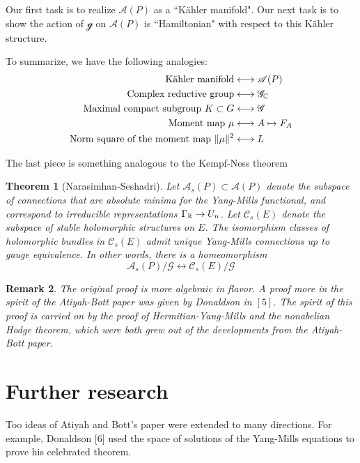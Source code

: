 \documentclass[11pt]{amsart}
\numberwithin{equation}{section}
\theoremstyle{plain}
\theoremstyle{plain}
\newtheorem{thmsub}{Theorem}[subsection]
\newtheorem{remksub}[thmsub]{Remark}
\numberwithin{equation}{section}
\begin{document}
Our first task is to realize $\mathscr{A}(P)$ as a “Kähler manifold". Our next task is to show the action of $\mathscr{g}$ on $\mathscr{A}(P)$ is “Hamiltonian" with respect to this Kähler structure.

To summarize, we have the following analogies:
$$
\begin{aligned}
\text{Kähler manifold}&\longleftrightarrow\mathscr{A}(P)\\
\text{Complex reductive group}&\longleftrightarrow\mathscr{G}_{\Bbb{C}}\\
\text{Maximal compact subgroup $K\subset G$}&\longleftrightarrow\mathscr{G}\\
\text{Moment map $\mu$}&\longleftrightarrow A\mapsto F_A\\
\text{Norm square of the moment map $\|\mu\|^2$}&\longleftrightarrow L
\end{aligned}
$$

The last piece is something analogous to the Kempf-Ness theorem
\begin{thmsub}[Narasimhan-Seshadri]
Let $\mathscr{A}_s(P)\subset\mathscr{A}(P)$ denote the subspace of connections that are absolute minima for the Yang-Mills functional, and correspond to irreducible representations $\Gamma_{\Bbb{R}}\to U_n$. Let $\mathscr{C}_s(E)$ denote the subspace of stable holomorphic structures on $E$. The isomorphism classes of holomorphic bundles in $\mathscr{C}_s(E)$ admit unique Yang-Mills connections up to gauge equivalence. In other words, there is a homeomorphism 
$$
\mathscr{A}_s(P)/\mathscr{G}\longleftrightarrow\mathscr{C}_s(E)/\mathscr{G}
$$
\end{thmsub}
\begin{remksub}\normalfont
The original proof is more algebraic in flavor. A proof more in the spirit of the Atiyah-Bott paper was given by Donaldson in $[5]$. The spirit of this proof is carried on by the proof of Hermitian-Yang-Mills and the nonabelian Hodge theorem, which were both grew out of the developments from the Atiyah-Bott paper.
\end{remksub}



\section{Further research}
Too ideas of Atiyah and Bott's paper were extended to many directions. For example, Donaldson [6] used the space of solutions of the Yang-Mills equations to prove his celebrated theorem.
\end{document}
